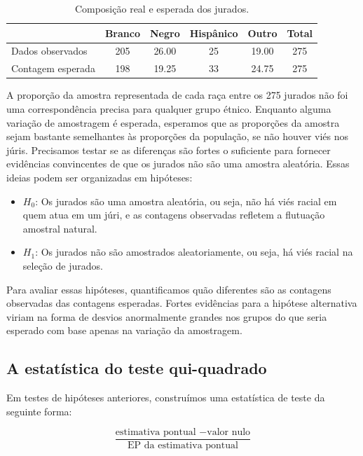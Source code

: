 \documentclass[
]{book}
\theoremstyle{definition}
\theoremstyle{definition}
\theoremstyle{definition}
\theoremstyle{definition}
\theoremstyle{remark}
\begin{document}
\begin{table}

\caption{\label{tab:expectedJuryRepresentationIfNoBias}Composição real e esperada dos jurados.}
\centering
\begin{tabular}[t]{l|c|c|c|c|c}
\hline
  & Branco & Negro & Hispânico & Outro & Total\\
\hline
Dados observados & 205 & 26.00 & 25 & 19.00 & 275\\
\hline
Contagem esperada & 198 & 19.25 & 33 & 24.75 & 275\\
\hline
\end{tabular}
\end{table}

A proporção da amostra representada de cada raça entre os 275 jurados não foi uma correspondência precisa para qualquer grupo étnico. Enquanto alguma variação de amostragem é esperada, esperamos que as proporções da amostra sejam bastante semelhantes às proporções da população, se não houver viés nos júris. Precisamos testar se as diferenças são fortes o suficiente para fornecer evidências convincentes de que os jurados não são uma amostra aleatória. Essas ideias podem ser organizadas em hipóteses:

\begin{itemize}
\item
  \textbf{\(H_0\)}: Os jurados são uma amostra aleatória, ou seja, não há viés racial em quem atua em um júri, e as contagens observadas refletem a flutuação amostral natural.
\item
  \textbf{\(H_1\)}: Os jurados não são amostrados aleatoriamente, ou seja, há viés racial na seleção de jurados.
\end{itemize}

Para avaliar essas hipóteses, quantificamos quão diferentes são as contagens observadas das contagens esperadas. Fortes evidências para a hipótese alternativa viriam na forma de desvios anormalmente grandes nos grupos do que seria esperado com base apenas na variação da amostragem.

\hypertarget{chiSquareTestStatistics}{%
\subsection{A estatística do teste qui-quadrado}\label{chiSquareTestStatistics}}

Em testes de hipóteses anteriores, construímos uma estatística de teste da seguinte forma:

\[ \frac{\text{estimativa pontual } - \text{valor nulo}}{\text{EP da estimativa pontual}} \]
\end{document}
